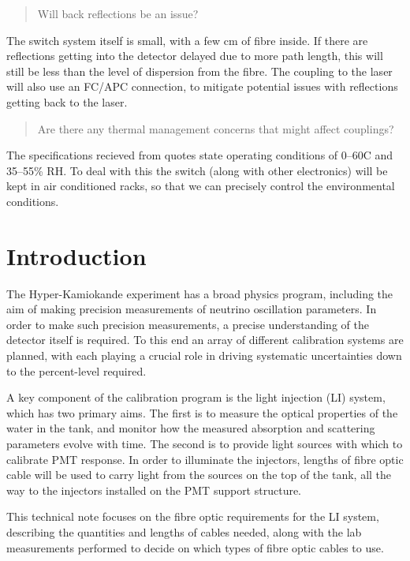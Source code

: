 \documentclass[a4paper,11pt]{article}
\begin{document}
\begin{quote}
    Will back reflections be an issue?
\end{quote}
The switch system itself is small, with a few cm of fibre inside. If there are reflections getting into the detector delayed due to more path length, this will still be less than the level of dispersion from the fibre. The coupling to the laser will also use an FC/APC connection, to mitigate potential issues with reflections getting back to the laser.

\begin{quote}
    Are there any thermal management concerns that might affect couplings?
\end{quote}
The specifications recieved from quotes state operating conditions of 0--60\degree C and 35--55\% RH. To deal with this the switch (along with other electronics) will be kept in air conditioned racks, so that we can precisely control the environmental conditions.

\clearpage
\newpage

\section{Introduction}\label{sec:intro}
The Hyper-Kamiokande experiment has a broad physics program, including the aim of making precision measurements of neutrino oscillation parameters. In order to make such precision measurements, a precise understanding of the detector itself is required. To this end an array of different calibration systems are planned, with each playing a crucial role in driving systematic uncertainties down to the percent-level required.

A key component of the calibration program is the light injection (LI) system, which has two primary aims. The first is to measure the optical properties of the water in the tank, and monitor how the measured absorption and scattering parameters evolve with time. The second is to provide light sources with which to calibrate PMT response. In order to illuminate the injectors, lengths of fibre optic cable will be used to carry light from the sources on the top of the tank, all the way to the injectors installed on the PMT support structure.

This technical note focuses on the fibre optic requirements for the LI system, describing the quantities and lengths of cables needed, along with the lab measurements performed to decide on which types of fibre optic cables to use.
\end{document}
